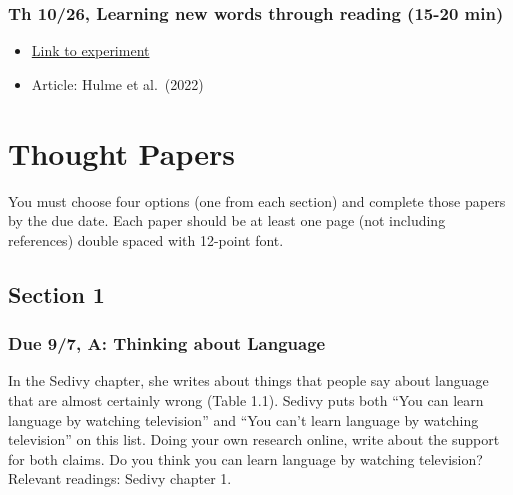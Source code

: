 \documentclass[
  letterpaper,
  DIV=11,
  numbers=noendperiod]{scrreprt}
\providecommand{\tightlist}{%
  \setlength{\itemsep}{0pt}\setlength{\parskip}{0pt}}\usepackage{longtable,booktabs,array}
\begin{document}
\hypertarget{th-1026-learning-new-words-through-reading-15-20-min}{%
\subsection*{Th 10/26, Learning new words through reading (15-20
min)}\label{th-1026-learning-new-words-through-reading-15-20-min}}

\begin{itemize}
\tightlist
\item
  \href{https://research.sc/participant/login/dynamic/B3E7A61D-6F92-4B3A-B80A-8D8513D01C6B}{Link
  to experiment}
\item
  Article: Hulme et al.~(2022)
\end{itemize}

\hypertarget{thought-papers}{%
\chapter*{Thought Papers}\label{thought-papers}}


You must choose four options (one from each section) and complete those
papers by the due date. Each paper should be at least one page (not
including references) double spaced with 12-point font.

\hypertarget{section-1}{%
\section*{\texorpdfstring{{Section 1}}{Section 1}}\label{section-1}}


\hypertarget{due-97-a-thinking-about-language}{%
\subsection*{Due 9/7, A: Thinking about
Language}\label{due-97-a-thinking-about-language}}

In the Sedivy chapter, she writes about things that people say about
language that are almost certainly wrong (Table 1.1). Sedivy puts both
``You can learn language by watching television'' and ``You can't learn
language by watching television'' on this list. Doing your own research
online, write about the support for both claims. Do you think you can
learn language by watching television? Relevant readings: Sedivy chapter
1.
\end{document}
